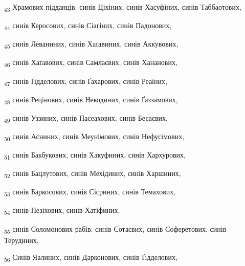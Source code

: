 \begin{tcolorbox}
\textsubscript{43} Храмових підданців: синів Ціхіних, синів Хасуфіних, синів Таббаотових,
\end{tcolorbox}
\begin{tcolorbox}
\textsubscript{44} синів Керосових, синів Сіагіних, синів Падонових,
\end{tcolorbox}
\begin{tcolorbox}
\textsubscript{45} синів Леваниних, синів Хаґавиних, синів Аккувових,
\end{tcolorbox}
\begin{tcolorbox}
\textsubscript{46} синів Хаґавових, синів Самлаєвих, синів Хананових,
\end{tcolorbox}
\begin{tcolorbox}
\textsubscript{47} синів Ґідделових, синів Ґахарових, синів Реаїних,
\end{tcolorbox}
\begin{tcolorbox}
\textsubscript{48} синів Рецінових, синів Некодиних, синів Ґаззамових,
\end{tcolorbox}
\begin{tcolorbox}
\textsubscript{49} синів Уззиних, синів Пасеахових, синів Бесаєвих,
\end{tcolorbox}
\begin{tcolorbox}
\textsubscript{50} синів Асниних, синів Меунімових, синів Нефусімових,
\end{tcolorbox}
\begin{tcolorbox}
\textsubscript{51} синів Бакбукових, синів Хакуфиних, синів Хархурових,
\end{tcolorbox}
\begin{tcolorbox}
\textsubscript{52} синів Бацлутових, синів Мехідиних, синів Харшиних,
\end{tcolorbox}
\begin{tcolorbox}
\textsubscript{53} синів Баркосових, синів Сісриних, синів Темахових,
\end{tcolorbox}
\begin{tcolorbox}
\textsubscript{54} синів Незіхових, синів Хатіфиних,
\end{tcolorbox}
\begin{tcolorbox}
\textsubscript{55} синів Соломонових рабів: синів Сотаєвих, синів Соферетових, синів Терудиних,
\end{tcolorbox}
\begin{tcolorbox}
\textsubscript{56} Синів Яалиних, синів Дарконових, синів Ґідделових,
\end{tcolorbox}
